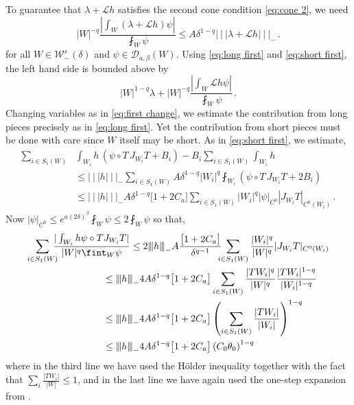 \documentclass{amsart}
\numberwithin{equation}{section}
\newcommand\cD{{\mathcal D}}
\newcommand\cL{{\mathcal L}}
\newcommand\cW{{\mathcal W}}
\newcommand{\tri}{{|\:\!\!|\:\!\!|}}
\begin{document}
To guarantee that $\lambda + \cL h$ satisfies the second cone condition \eqref{eq:cone 2}, we need
\begin{equation}
\label{eq:cone 2 prelim}
|W|^{-q} \frac{|\int_W (\lambda + \cL h) \psi |}{\fint_W \psi} \le A \delta^{1-q} \tri \lambda + \cL h \tri _-\, .
\end{equation}
for all $W \in \cW^s_-(\delta)$ and $\psi \in \cD_{a, \beta}(W)$.
Using \eqref{eq:long first} and \eqref{eq:short first}, the left hand side is bounded above by
\begin{equation}
\label{eq:cone 2 first}
|W|^{1-q} \lambda + |W|^{-q} \frac{| \int_W \cL h \psi |}{\fint_W \psi} \, .
\end{equation}
Changing variables as in \eqref{eq:first change}, we estimate the contribution from long pieces
precisely as in \eqref{eq:long first}.  Yet the contribution from short pieces must be done with 
care since $W$ itself may be short.  As in \eqref{eq:short first}, we estimate,
\[
\begin{split}
\sum_{i \in S_1(W)} & \int_{W_i} h \, (\psi \circ T \, J_{W_i}T  + B_i) - B_i \sum_{i \in S_1(W)} \int_{W_i} h 
\\
& \le \tri h \tri_- \sum_{i \in S_1(W)} A \delta^{1-q} |W_i|^q \fint_{W_i}  (\psi \circ T \, J_{W_i} T + 2B_i) \\
& \le \tri h \tri_- A \delta^{1-q} \big[ 1 + 2C_a \big]  
\sum_{i \in S_1(W)} |W_i|^q |\psi|_{C^0} |J_{W_i}T|_{C^0(W_i)} \, .
\end{split}
\]
Now $| \psi|_{C^0} \le e^{a(2\delta)^\beta} \fint_W \psi \le 2 \fint_W \psi$ so that,
\begin{equation}
\label{eq:short short}
\begin{split}
\sum_{i \in S_1(W)}\!\!\!\!  \frac{|\int_{W_i} h \psi \circ T J_{W_i}T|}{|W|^{q}\fint_W \psi}
&\le 2 \tri h \tri_- A  \frac{\big[ 1 + 2 C_a \big] }{ \delta^{q-1}}\hskip-6pt
\sum_{i \in S_1(W)} \frac{|W_i|^q}{|W|^q} |J_{W_i}T|_{C^0(W_i)} \\
& \hskip -1cm\le \tri h \tri_- 4 A \delta^{1-q} \big[ 1 + 2 C_a \big]  
\sum_{i \in S_1(W)} \frac{|TW_i|^{q}}{|W|^{q}} \frac{|TW_i|^{1-q}}{|W_i|^{1-q}} \\
& \hskip -1cm \le  \tri h \tri_- 4A \delta^{1-q} \big[ 1 + 2 C_a \big]  
\left( \sum_{i \in S_1(W)} \frac{|TW_i|}{|W_i|} \right)^{1-q} \\
& \hskip -1cm\le  \tri h \tri_- 4A \delta^{1-q} \big[ 1 + 2 C_a \big] \left( C_0 \theta_0 \right)^{1-q}
\end{split}
\end{equation}
where in the third line we have used the H\"older inequality together with the fact that
$\sum_i \frac{|TW_i|}{|W|} \le 1$, and in the last line we have again used the one-step
expansion from \cite[eq.~(3.4)]{DL22}.
\end{document}
